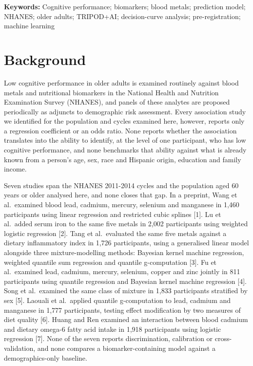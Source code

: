 \documentclass[12pt]{article}
\begin{document}
\medskip
\noindent\textbf{Keywords:} Cognitive performance; biomarkers; blood metals; prediction model; NHANES; older adults; TRIPOD+AI; decision-curve analysis; pre-registration; machine learning

\clearpage

\section*{Background}

Low cognitive performance in older adults is examined routinely against blood metals and nutritional biomarkers in the National Health and Nutrition Examination Survey (NHANES), and panels of these analytes are proposed periodically as adjuncts to demographic risk assessment. Every association study we identified for the population and cycles examined here, however, reports only a regression coefficient or an odds ratio. None reports whether the association translates into the ability to identify, at the level of one participant, who has low cognitive performance, and none benchmarks that ability against what is already known from a person's age, sex, race and Hispanic origin, education and family income.

Seven studies span the NHANES 2011-2014 cycles and the population aged 60 years or older analysed here, and none closes that gap. In a preprint, Wang et al.\ examined blood lead, cadmium, mercury, selenium and manganese in 1,460 participants using linear regression and restricted cubic splines [1]. Lu et al.\ added serum iron to the same five metals in 2,002 participants using weighted logistic regression [2]. Tang et al.\ evaluated the same five metals against a dietary inflammatory index in 1,726 participants, using a generalised linear model alongside three mixture-modelling methods: Bayesian kernel machine regression, weighted quantile sum regression and quantile g-computation [3]. Fu et al.\ examined lead, cadmium, mercury, selenium, copper and zinc jointly in 811 participants using quantile regression and Bayesian kernel machine regression [4]. Song et al.\ examined the same class of mixture in 1,833 participants stratified by sex [5]. Laouali et al.\ applied quantile g-computation to lead, cadmium and manganese in 1,777 participants, testing effect modification by two measures of diet quality [6]. Huang and Ren examined an interaction between blood cadmium and dietary omega-6 fatty acid intake in 1,918 participants using logistic regression [7]. None of the seven reports discrimination, calibration or cross-validation, and none compares a biomarker-containing model against a demographics-only baseline.
\end{document}
